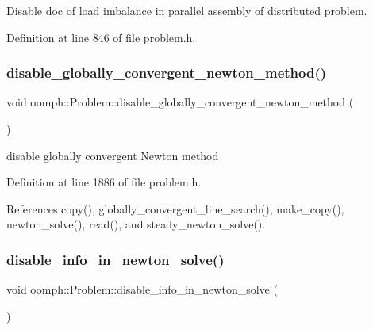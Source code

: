 Disable doc of load imbalance in parallel assembly of distributed problem. 



Definition at line 846 of file problem.\+h.

\mbox{\label{classoomph_1_1Problem_a927d35230db6fc5021b68eadaedac9a6}} 
\subsubsection{\texorpdfstring{disable\+\_\+globally\+\_\+convergent\+\_\+newton\+\_\+method()}{disable\_globally\_convergent\_newton\_method()}}
{\footnotesize\ttfamily void oomph\+::\+Problem\+::disable\+\_\+globally\+\_\+convergent\+\_\+newton\+\_\+method (\begin{DoxyParamCaption}{ }\end{DoxyParamCaption})\hspace{0.3cm}{\ttfamily [inline]}}



disable globally convergent Newton method 



Definition at line 1886 of file problem.\+h.



References copy(), globally\+\_\+convergent\+\_\+line\+\_\+search(), make\+\_\+copy(), newton\+\_\+solve(), read(), and steady\+\_\+newton\+\_\+solve().

\mbox{\label{classoomph_1_1Problem_af00e3623681347439fe3dac650423bbe}} 
\subsubsection{\texorpdfstring{disable\+\_\+info\+\_\+in\+\_\+newton\+\_\+solve()}{disable\_info\_in\_newton\_solve()}}
{\footnotesize\ttfamily void oomph\+::\+Problem\+::disable\+\_\+info\+\_\+in\+\_\+newton\+\_\+solve (\begin{DoxyParamCaption}{ }\end{DoxyParamCaption})\hspace{0.3cm}{\ttfamily [inline]}}




